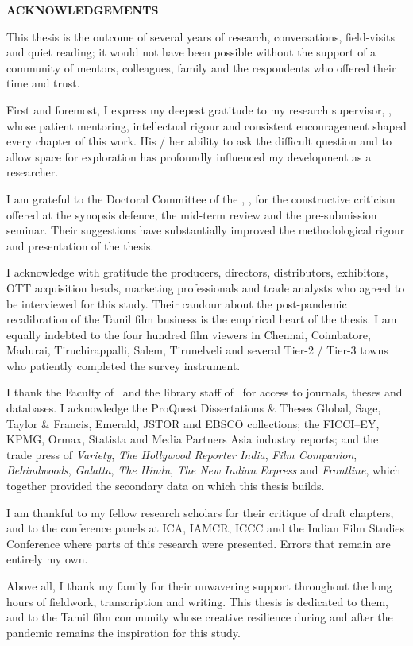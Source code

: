 \thispagestyle{empty}
\begin{center}
{\large \bfseries ACKNOWLEDGEMENTS}
\end{center}
\vspace{0.6cm}

\noindent
This thesis is the outcome of several years of research, conversations,
field-visits and quiet reading; it would not have been possible without
the support of a community of mentors, colleagues, family and the
respondents who offered their time and trust.

\medskip
\noindent
First and foremost, I express my deepest gratitude to my research
supervisor, \supervisor, whose patient mentoring, intellectual rigour
and consistent encouragement shaped every chapter of this work.  His /
her ability to ask the difficult question and to allow space for
exploration has profoundly influenced my development as a researcher.

\medskip
\noindent
I am grateful to the Doctoral Committee of the \department, \institution,
for the constructive criticism offered at the synopsis defence, the
mid-term review and the pre-submission seminar. Their suggestions have
substantially improved the methodological rigour and presentation of
the thesis.

\medskip
\noindent
I acknowledge with gratitude the producers, directors, distributors,
exhibitors, OTT acquisition heads, marketing professionals and trade
analysts who agreed to be interviewed for this study.  Their candour
about the post-pandemic recalibration of the Tamil film business is
the empirical heart of the thesis.  I am equally indebted to the four
hundred film viewers in Chennai, Coimbatore, Madurai, Tiruchirappalli,
Salem, Tirunelveli and several Tier-2 / Tier-3 towns who patiently
completed the survey instrument.

\medskip
\noindent
I thank the Faculty of \department\ and the library staff of
\institution\ for access to journals, theses and databases.  I
acknowledge the ProQuest Dissertations \& Theses Global, Sage, Taylor
\& Francis, Emerald, JSTOR and EBSCO collections; the FICCI--EY,
KPMG, Ormax, Statista and Media Partners Asia industry reports; and
the trade press of \emph{Variety}, \emph{The Hollywood Reporter India},
\emph{Film Companion}, \emph{Behindwoods}, \emph{Galatta}, \emph{The
Hindu}, \emph{The New Indian Express} and \emph{Frontline}, which
together provided the secondary data on which this thesis builds.

\medskip
\noindent
I am thankful to my fellow research scholars for their critique of
draft chapters, and to the conference panels at ICA, IAMCR, ICCC and
the Indian Film Studies Conference where parts of this research were
presented.  Errors that remain are entirely my own.

\medskip
\noindent
Above all, I thank my family for their unwavering support throughout
the long hours of fieldwork, transcription and writing.  This thesis
is dedicated to them, and to the Tamil film community whose creative
resilience during and after the pandemic remains the inspiration for
this study.

\vspace{2cm}
\hfill \textbf{\researcher}
\clearpage
